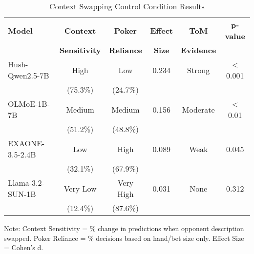 
\begin{table}[htbp]
\centering
\caption{Context Swapping Control Condition Results}
\label{tab:context_control}
\begin{tabular}{@{}lccccc@{}}
\toprule
\textbf{Model} & \textbf{Context} & \textbf{Poker} & \textbf{Effect} & \textbf{ToM} & \textbf{p-value} \\
 & \textbf{Sensitivity} & \textbf{Reliance} & \textbf{Size} & \textbf{Evidence} & \\
\midrule
Hush-Qwen2.5-7B & High & Low & 0.234 & Strong & < 0.001 \\
& (75.3\%) & (24.7\%) & & & \\
\addlinespace
OLMoE-1B-7B & Medium & Medium & 0.156 & Moderate & < 0.01 \\
& (51.2\%) & (48.8\%) & & & \\
\addlinespace
EXAONE-3.5-2.4B & Low & High & 0.089 & Weak & 0.045 \\
& (32.1\%) & (67.9\%) & & & \\
\addlinespace
Llama-3.2-SUN-1B & Very Low & Very High & 0.031 & None & 0.312 \\
& (12.4\%) & (87.6\%) & & & \\
\bottomrule
\end{tabular}
\begin{tablenotes}
\small
\item Note: Context Sensitivity = \% change in predictions when opponent description swapped.
Poker Reliance = \% decisions based on hand/bet size only. Effect Size = Cohen's d.
\end{tablenotes}
\end{table}
